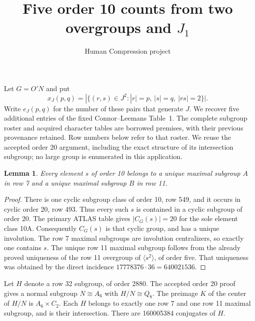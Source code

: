 \documentclass[11pt,a4paper]{article}
\title{Five order 10 counts from two overgroups and $J_1$}
\author{Human Compression project}\date{}
\newtheorem{lemma}{Lemma}\newtheorem{theorem}{Theorem}
\begin{document}
\maketitle
Let $G=O'N$ and put
\[
 x_J(p,q)=|\{(r,s)\in J^2:|r|=p,\ |s|=q,\ |rs|=2\}|.
\]
Write $e_J(p,q)$ for the number of these pairs that generate $J$.
We recover five additional entries of the fixed Connor--Leemans
Table~1. The complete subgroup roster and acquired character tables
are borrowed premises, with their previous provenance retained.
Row numbers below refer to that roster. We reuse the accepted
order 20 argument, including the exact structure of its intersection
subgroup; no large group is enumerated in this application.

\begin{lemma}\label{unique}
Every element $s$ of order 10 belongs to a unique maximal subgroup
$A$ in row 7 and a unique maximal subgroup $B$ in row 11.
\end{lemma}
\begin{proof}
There is one cyclic subgroup class of order 10, row 549, and it
occurs in cyclic order 20, row 493. Thus every such $s$ is contained
in a cyclic subgroup of order 20. The primary ATLAS table gives
$|C_G(s)|=20$ for the sole element class 10A. Consequently $C_G(s)$
is that cyclic group, and has a unique involution. The row 7 maximal
subgroups are involution centralizers, so exactly one contains $s$.
The unique row 11 maximal subgroup follows from the already proved
uniqueness of the row 11 overgroup of $\langle s^2\rangle$, of order
five. That uniqueness was obtained by the direct incidence
$17778376\cdot36=640021536$.
\end{proof}

Let $H$ denote a row 32 subgroup, of order 2880. The accepted order
20 proof gives a normal subgroup $N\cong A_6$ with $H/N\cong Q_8$.
The preimage $K$ of the center of $H/N$ is $A_6\times C_2$.
Each $H$ belongs to exactly one row 7 and one row 11 maximal subgroup,
and is their intersection. There are 160005384 conjugates of $H$.
\end{document}
